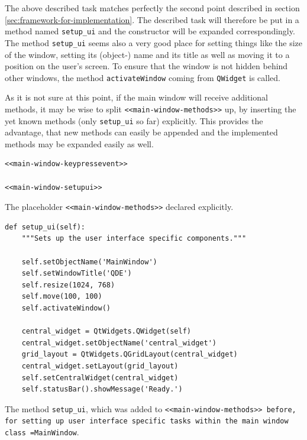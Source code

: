 \documentclass[10pt, openright, notitlepage]{scrreprt}
\begin{document}
The above described task matches perfectly the second point described in section
\ref{sec:framework-for-implementation}. The described task will therefore be put in a
method named \texttt{setup\_ui} and the constructor will be expanded correspondingly.
The method \texttt{setup\_ui} seems also a very good place for setting things like the
size of the window, setting its (object-) name and its title as well as moving
it to a position on the user's screen. To ensure that the window is not hidden
behind other windows, the method \texttt{activateWindow} coming from \texttt{QWidget} is
called.

As it is not sure at this point, if the main window will receive additional
methods, it may be wise to split \texttt{<<main-window-methods>>} up, by inserting the
yet known methods (only \texttt{setup\_ui} so far) explicitly. This provides the
advantage, that new methods can easily be appended and the implemented methods
may be expanded easily as well.

\begin{listing}[H]
\begin{verbatim}
<<main-window-keypressevent>>

<<main-window-setupui>>
\end{verbatim}
\caption{\label{main-window-methods}
The placeholder \texttt{<<main-window-methods>>} declared explicitly.}
\end{listing}

\begin{listing}[H]
\begin{verbatim}
def setup_ui(self):
    """Sets up the user interface specific components."""

    self.setObjectName('MainWindow')
    self.setWindowTitle('QDE')
    self.resize(1024, 768)
    self.move(100, 100)
    self.activateWindow()

    central_widget = QtWidgets.QWidget(self)
    central_widget.setObjectName('central_widget')
    grid_layout = QtWidgets.QGridLayout(central_widget)
    central_widget.setLayout(grid_layout)
    self.setCentralWidget(central_widget)
    self.statusBar().showMessage('Ready.')
\end{verbatim}
\caption{\label{main-window-setupui}
The method \texttt{setup\_ui}, which was added to \texttt{<<main-window-methods>> before, for setting up user interface specific tasks within the main window class =MainWindow}.}
\end{listing}
\end{document}
